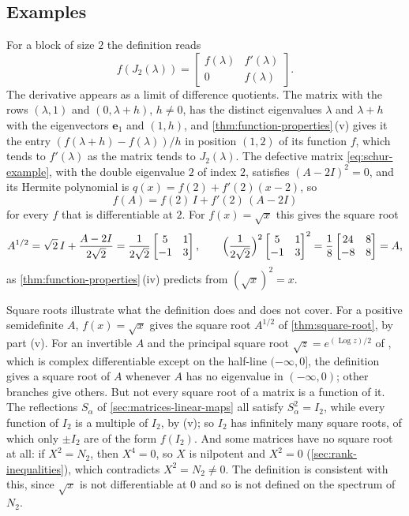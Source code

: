 \subsection{Examples}

For a block of size $2$ the definition reads
\[
f(J_2(\lambda))=\begin{bmatrix}f(\lambda)&f'(\lambda)\\0&f(\lambda)\end{bmatrix}.
\]
The derivative appears as a limit of difference quotients. The matrix with the rows $(\lambda,1)$ and $(0,\lambda+h)$, $h\ne0$, has the distinct eigenvalues $\lambda$ and $\lambda+h$ with the eigenvectors $\mathbf e_1$ and $(1,h)$, and \cref{thm:function-properties}\,(v) gives it the entry $(f(\lambda+h)-f(\lambda))/h$ in position $(1,2)$ of its function $f$, which tends to $f'(\lambda)$ as the matrix tends to $J_2(\lambda)$. The defective matrix \eqref{eq:schur-example}, with the double eigenvalue $2$ of index $2$, satisfies $(A-2I)^2=0$, and its Hermite polynomial is $q(x)=f(2)+f'(2)(x-2)$, so
\[
f(A)=f(2)\,I+f'(2)\,(A-2I)
\]
for every $f$ that is differentiable at $2$. For $f(x)=\sqrt x$ this gives the square root
\[
A^{1/2}=\sqrt2\,I+\frac{A-2I}{2\sqrt2}=\frac1{2\sqrt2}\begin{bmatrix}5&1\\-1&3\end{bmatrix},\qquad\Bigl(\frac1{2\sqrt2}\Bigr)^2\begin{bmatrix}5&1\\-1&3\end{bmatrix}^2=\frac18\begin{bmatrix}24&8\\-8&8\end{bmatrix}=A ,
\]
as \cref{thm:function-properties}\,(iv) predicts from $(\sqrt x)^2=x$.

Square roots illustrate what the definition does and does not cover. For a positive semidefinite $A$, $f(x)=\sqrt x$ gives the square root $A^{1/2}$ of \cref{thm:square-root}, by part (v). For an invertible $A$ and the principal square root $\sqrt z=e^{(\operatorname{Log}z)/2}$ of , which is complex differentiable except on the half-line $(-\infty,0]$, the definition gives a square root of $A$ whenever $A$ has no eigenvalue in $(-\infty,0)$; other branches give others. But not every square root of a matrix is a function of it. The reflections $S_\alpha$ of \cref{sec:matrices-linear-maps} all satisfy $S_\alpha^2=I_2$, while every function of $I_2$ is a multiple of $I_2$, by (v); so $I_2$ has infinitely many square roots, of which only $\pm I_2$ are of the form $f(I_2)$. And some matrices have no square root at all: if $X^2=N_2$, then $X^4=0$, so $X$ is nilpotent and $X^2=0$ (\cref{sec:rank-inequalities}), which contradicts $X^2=N_2\ne0$. The definition is consistent with this, since $\sqrt x$ is not differentiable at $0$ and so is not defined on the spectrum of $N_2$.


